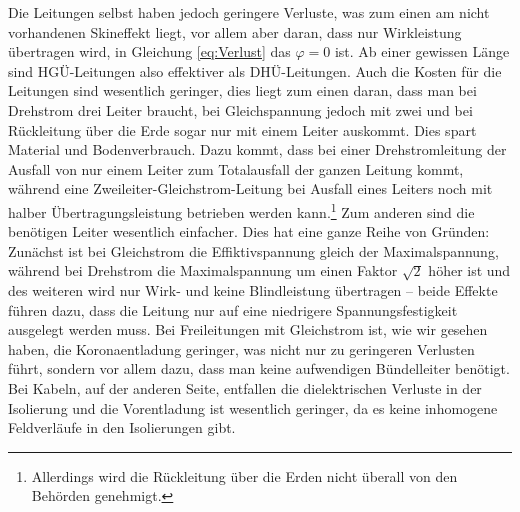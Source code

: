 Die Leitungen selbst haben jedoch geringere Verluste, was zum einen am nicht vorhandenen Skineffekt liegt, vor allem aber daran, dass nur Wirkleistung übertragen wird, in Gleichung \ref{eq:Verlust} das $\varphi=0$ ist. Ab einer gewissen Länge sind HGÜ-Leitungen also effektiver als DHÜ-Leitungen.
Auch die Kosten für die Leitungen sind wesentlich geringer, dies liegt zum einen daran, dass man bei Drehstrom drei Leiter braucht, bei Gleichspannung jedoch mit zwei und bei Rückleitung über die Erde sogar nur mit einem Leiter auskommt. Dies spart Material und Bodenverbrauch. %
Dazu kommt, dass bei einer Drehstromleitung der Ausfall von nur einem Leiter zum Totalausfall der ganzen Leitung kommt, während eine Zweileiter-Gleichstrom-Leitung bei Ausfall eines Leiters noch mit halber Übertragungsleistung betrieben werden kann.\cite{Schymroch}\footnote{Allerdings wird die Rückleitung über die Erden nicht überall von den Behörden genehmigt.}%
Zum anderen sind die benötigen Leiter wesentlich einfacher. Dies hat eine ganze Reihe von Gründen:
Zunächst ist bei Gleichstrom die Effiktivspannung gleich der Maximalspannung, während bei Drehstrom die Maximalspannung um einen Faktor $\sqrt{2}$ höher ist und des weiteren wird nur Wirk- und keine Blindleistung übertragen -- beide Effekte führen dazu, dass die Leitung nur auf eine niedrigere Spannungsfestigkeit ausgelegt werden muss. %
Bei Freileitungen mit Gleichstrom ist, wie wir gesehen haben, die Koronaentladung geringer, was nicht nur zu geringeren Verlusten führt, sondern vor allem dazu, dass man keine aufwendigen Bündelleiter benötigt.
Bei Kabeln, auf der anderen Seite, entfallen die dielektrischen Verluste in der Isolierung und die Vorentladung ist wesentlich geringer, da es keine inhomogene Feldverläufe in den Isolierungen gibt. %

